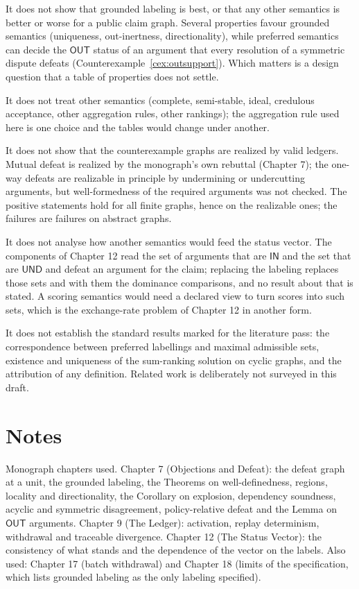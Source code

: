 \documentclass[11pt]{article}
\theoremstyle{plain}
\theoremstyle{definition}
\theoremstyle{remark}
\newcommand{\IN}{\textsf{IN}}
\newcommand{\OUT}{\textsf{OUT}}
\newcommand{\UND}{\textsf{UND}}
\begin{document}
It does not show that grounded labeling is best, or that any other semantics is better or worse for a public claim graph. Several properties favour grounded semantics (uniqueness, out-inertness, directionality), while preferred semantics can decide the $\OUT$ status of an argument that every resolution of a symmetric dispute defeats (Counterexample~\ref{cex:outsupport}). Which matters is a design question that a table of properties does not settle.

It does not treat other semantics (complete, semi-stable, ideal, credulous acceptance, other aggregation rules, other rankings); the aggregation rule used here is one choice and the tables would change under another.

It does not show that the counterexample graphs are realized by valid ledgers. Mutual defeat is realized by the monograph's own rebuttal (Chapter 7); the one-way defeats are realizable in principle by undermining or undercutting arguments, but well-formedness of the required arguments was not checked. The positive statements hold for all finite graphs, hence on the realizable ones; the failures are failures on abstract graphs.

It does not analyse how another semantics would feed the status vector. The components of Chapter 12 read the set of arguments that are $\IN$ and the set that are $\UND$ and defeat an argument for the claim; replacing the labeling replaces those sets and with them the dominance comparisons, and no result about that is stated. A scoring semantics would need a declared view to turn scores into such sets, which is the exchange-rate problem of Chapter 12 in another form.

It does not establish the standard results marked for the literature pass: the correspondence between preferred labellings and maximal admissible sets, existence and uniqueness of the sum-ranking solution on cyclic graphs, and the attribution of any definition. Related work is deliberately not surveyed in this draft.

\section*{Notes}

Monograph chapters used. Chapter 7 (Objections and Defeat): the defeat graph at a unit, the grounded labeling, the Theorems on well-definedness, regions, locality and directionality, the Corollary on explosion, dependency soundness, acyclic and symmetric disagreement, policy-relative defeat and the Lemma on $\OUT$ arguments. Chapter 9 (The Ledger): activation, replay determinism, withdrawal and traceable divergence. Chapter 12 (The Status Vector): the consistency of what stands and the dependence of the vector on the labels. Also used: Chapter 17 (batch withdrawal) and Chapter 18 (limits of the specification, which lists grounded labeling as the only labeling specified).
\end{document}
